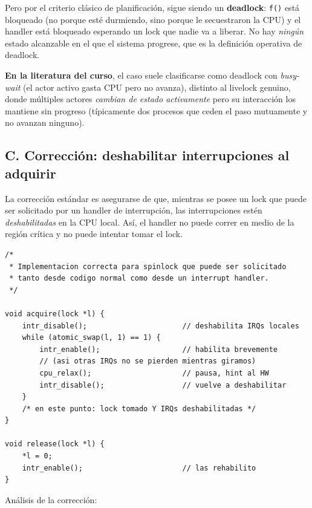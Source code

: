 \documentclass[11pt,a4paper]{article}
\begin{document}
Pero por el criterio clásico de planificación, sigue siendo un
\textbf{deadlock}: \texttt{f()} está bloqueado (no porque esté
durmiendo, sino porque le secuestraron la CPU) y el handler está
bloqueado esperando un lock que nadie va a liberar. No hay
\emph{ningún} estado alcanzable en el que el sistema progrese, que es
la definición operativa de deadlock.

\textbf{En la literatura del curso}, el caso suele clasificarse como
deadlock con \emph{busy-wait} (el actor activo gasta CPU pero no
avanza), distinto al livelock genuino, donde múltiples actores
\emph{cambian de estado activamente} pero su interacción los mantiene
sin progreso (típicamente dos procesos que ceden el paso mutuamente y
no avanzan ninguno).

\subsection*{C. Corrección: deshabilitar interrupciones al adquirir}

La corrección estándar es asegurarse de que, mientras se posee un lock
que puede ser solicitado por un handler de interrupción, las
interrupciones estén \emph{deshabilitadas} en la CPU local. Así, el
handler no puede correr en medio de la región crítica y no puede
intentar tomar el lock.

\begin{lstlisting}[style=cstyle]
/*
 * Implementacion correcta para spinlock que puede ser solicitado
 * tanto desde codigo normal como desde un interrupt handler.
 */

void acquire(lock *l) {
    intr_disable();                      // deshabilita IRQs locales
    while (atomic_swap(l, 1) == 1) {
        intr_enable();                   // habilita brevemente
        // (asi otras IRQs no se pierden mientras giramos)
        cpu_relax();                     // pausa, hint al HW
        intr_disable();                  // vuelve a deshabilitar
    }
    /* en este punto: lock tomado Y IRQs deshabilitadas */
}

void release(lock *l) {
    *l = 0;
    intr_enable();                       // las rehabilito
}
\end{lstlisting}

Análisis de la corrección:
\end{document}
